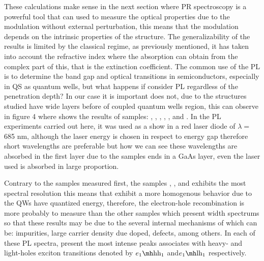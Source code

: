 These calculations make sense in the next section where PR spectroscopy is a powerful tool that can used to measure the optical properties due to the modulation without external perturbation, this means that the modulation depends on the intrinsic properties of the structure. The generalizability of the results is limited by the classical regime, as previously mentioned, it has taken into account the refractive index where the absorption can obtain from the complex part of this,  that is the extinction coefficient. The common use of the PL is to determine the band gap and optical transitions in semiconductors, especially in QS as quantum wells, but what happens if consider PL regardless of the penetration depth? 
In our case it is important does not, due to the structures studied have wide layers before of coupled quantum wells region, this can observe in figure 4 where shows the results of samples: , , , , , and .  In the PL experiments carried out here,  it was used as a show in  a red laser diode 
of  $\lambda=$685 nm, although the laser energy is chosen in respect to energy gap therefore short wavelengths are preferable but how we can see these wavelengths are absorbed in the first layer due to the samples ends in a GaAs layer, even the laser used is absorbed in large proportion. 

Contrary to the samples measured first, the samples , , and  exhibits the most spectral resolution this means that exhibit a more homogenous behavior  due to the QWs have quantized energy, therefore, the electron-hole recombination is more probably to measure than the other samples which present width spectrums so that these results may be due to the several internal mechanisms of which can be: impurities, large carrier density due doped,  defects, among others\cite{khmissi2010effectcarriers,kundrotas2005excitonic}. In each of these PL spectra,  present the most intense peaks associates with heavy- and light-holes exciton transitions denoted by $\thh{1}{1}$ and$\tlh{1}{1}$ respectively.

